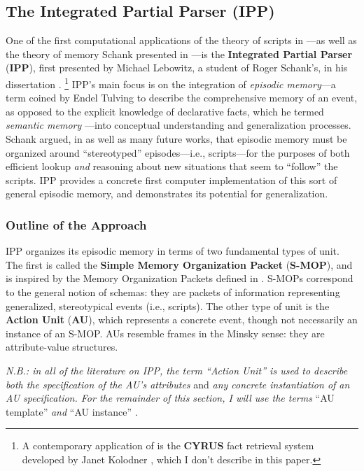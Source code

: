 \subsection{The Integrated Partial Parser (IPP)}
\label{sec:ipp}

One of the first computational applications of the theory of scripts in \citep{schankandabelson}---as well as the theory of memory Schank presented in \citep{schank1982dynamic}---is the \textbf{Integrated Partial Parser} (\textbf{IPP}), first presented by Michael Lebowitz, a student of Roger Schank's, in his dissertation \citep{lebowitz1980}. \footnote{A contemporary application of \citep{schank1982dynamic} is the \textbf{CYRUS} fact retrieval system developed by Janet Kolodner \citep{kolodner1983maintaining}, which I don't describe in this paper.} IPP's main focus is on the integration of \textit{episodic memory}---a term coined by Endel Tulving to describe the comprehensive memory of an event, as opposed to the explicit knowledge of declarative facts, which he termed \textit{semantic memory} \citep{tulving1972episodic}---into conceptual understanding and generalization processes. Schank argued, in \citep{schankandabelson} as well as many future works, that episodic memory must be organized around ``stereotyped'' episodes---i.e., scripts---for the purposes of both efficient lookup \textit{and} reasoning about new situations that seem to ``follow'' the scripts. IPP provides a concrete first computer implementation of this sort of general episodic memory, and demonstrates its potential for generalization.

\subsubsection{Outline of the Approach}

IPP organizes its episodic memory in terms of two fundamental types of unit. The first is called the \textbf{Simple Memory Organization Packet} (\textbf{S-MOP}), and is inspired by the Memory Organization Packets defined in \citep{schank1980language}. S-MOPs correspond to the general notion of schemas: they are packets of information representing generalized, stereotypical events (i.e., scripts). The other type of unit is the \textbf{Action Unit} (\textbf{AU}), which represents a concrete event, though not necessarily an instance of an S-MOP. AUs resemble frames in the Minsky sense: they are attribute-value structures.

\textit{N.B.: in all of the literature on IPP, the term ``Action Unit'' is used to describe both the specification of the AU's attributes} and \textit{any concrete instantiation of an AU specification. For the remainder of this section, I will use the terms} ``AU template'' \textit{and} ``AU instance'' \textit{.}

